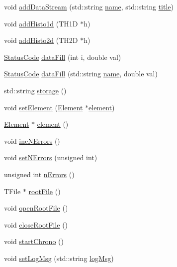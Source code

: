 \begin{DoxyCompactItemize}
\item 
void \hyperlink{classProcessus_a308c8f193802f1d1ab49d4447d0cb281}{add\+Data\+Stream} (std\+::string \hyperlink{classObject_a300f4c05dd468c7bb8b3c968868443c1}{name}, std\+::string \hyperlink{classObject_a73a0f1a41828fdd8303dd662446fb6c3}{title})
\item 
void \hyperlink{classProcessus_ad46e0d4dfdfdcbce001ee6be1746dfa4}{add\+Histo1d} (T\+H1D $\ast$h)
\item 
void \hyperlink{classProcessus_ac1ed1aed5edaeabdf18aa56775440471}{add\+Histo2d} (T\+H2D $\ast$h)
\item 
\hyperlink{classStatusCode}{Status\+Code} \hyperlink{classProcessus_a0d093b48f3218a088ba030e24372f18c}{data\+Fill} (int i, double val)
\item 
\hyperlink{classStatusCode}{Status\+Code} \hyperlink{classProcessus_aa31ab71711f7af6a729441ff573f69c9}{data\+Fill} (std\+::string \hyperlink{classObject_a300f4c05dd468c7bb8b3c968868443c1}{name}, double val)
\item 
std\+::string \hyperlink{classProcessus_a33fa1a0b54a636e5cdd680669fd9ea51}{storage} ()
\item 
void \hyperlink{classProcessus_a8ddef94227d83d9dae2cd49aebc33353}{set\+Element} (\hyperlink{classElement}{Element} $\ast$\hyperlink{classProcessus_a6fe155527431a7190b7d44d600b9608d}{element})
\item 
\hyperlink{classElement}{Element} $\ast$ \hyperlink{classProcessus_a6fe155527431a7190b7d44d600b9608d}{element} ()
\item 
void \hyperlink{classProcessus_abe603d0636f76db6aa6c5c60cf34c591}{inc\+N\+Errors} ()
\item 
void \hyperlink{classProcessus_a831b027b9cf18ab56fa6147b5d3055da}{set\+N\+Errors} (unsigned int)
\item 
unsigned int \hyperlink{classProcessus_a82a0487f82f07cc2c2dc2731f98149e7}{n\+Errors} ()
\item 
T\+File $\ast$ \hyperlink{classProcessus_a247e8c362ec08422cf53d08dd23b093c}{root\+File} ()
\item 
void \hyperlink{classProcessus_aacf6812880c1d1a2bf14a4a39458f443}{open\+Root\+File} ()
\item 
void \hyperlink{classProcessus_a2f3c41e99da4c738ea3d8f7b0d20a665}{close\+Root\+File} ()
\item 
void \hyperlink{classProcessus_a5e4d34b86241fa0756e07375a14ff4b2}{start\+Chrono} ()
\item 
void \hyperlink{classProcessus_a471833f89047aa9a7ff6200a31c17a1d}{set\+Log\+Msg} (std\+::string \hyperlink{classProcessus_a42fdeb17dc13ba854222666b6aa29b61}{log\+Msg})

\end{DoxyCompactItemize}
